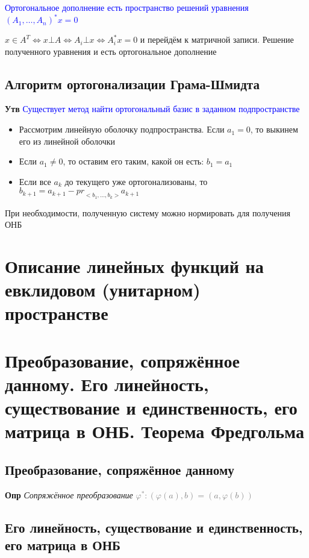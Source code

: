 \documentclass[a4paper, 14pt]{article}
\begin{document}
    \textcolor{blue}{Ортогональное дополнение есть пространство решений уравнения $(A_1, \dots, A_n)^* x = 0$}
    
    $x \in A^T \Leftrightarrow x \bot A \Leftrightarrow A_i \bot x \Leftrightarrow A_i^* x = 0$ и перейдём к матричной
    записи.
    Решение полученного уравнения и есть ортогональное дополнение
    
    \subsection{Алгоритм ортогонализации Грама-Шмидта}
    
    \textbf{Утв} \textcolor{blue}{Существует метод найти ортогональный базис в заданном подпространстве}
    
    \begin{itemize}
        \item Рассмотрим линейную оболочку подпространства.
        Если $a_1 = 0$, то выкинем его из линейной оболочки
        \item Если $a_1 \neq 0$, то оставим его таким, какой он есть: $b_1 = a_1$
        \item Если все $a_k$ до текущего уже ортогонализованы, то $b_{k+1} = a_{k+1} - {pr}_{<b_1, \dots, b_k>} a_{k+1}$
    \end{itemize}
    
    При необходимости, полученную систему можно нормировать для получения ОНБ
    
    \section{Описание линейных функций на евклидовом (унитарном) пространстве}
    
    \section{Преобразование, сопряжённое данному.
    Его линейность, существование и единственность, его матрица в ОНБ.
    Теорема Фредгольма}
    
    \subsection{Преобразование, сопряжённое данному}
    
    \textbf{Опр} \textit{Сопряжённое преобразование} \textcolor{gray}{$\varphi^*: (\varphi(a), b) = (a, \varphi(b))$}
    
    \subsection{Его линейность, существование и единственность, его матрица в ОНБ}
\end{document}
